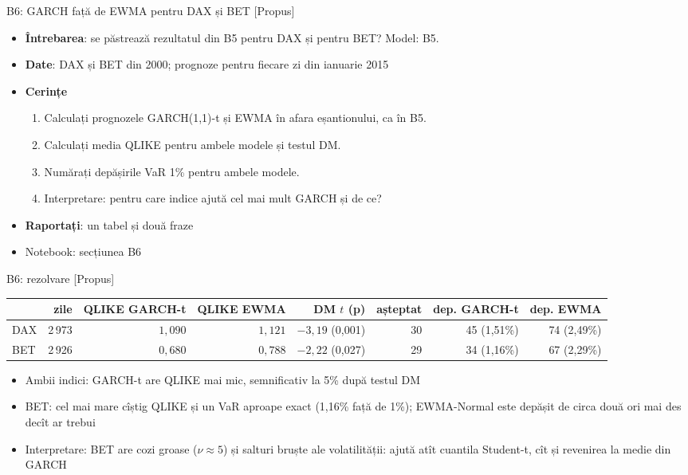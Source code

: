 \begin{frame}{B6: GARCH față de EWMA pentru DAX și BET [Propus]}
\itemsize{\footnotesize}
\begin{itemize}
\item \textbf{Întrebarea}: se păstrează rezultatul din B5 pentru DAX și pentru BET? Model: B5.
\item \textbf{Date}: DAX și BET din 2000; prognoze pentru fiecare zi din ianuarie 2015
\item \textbf{Cerințe}
\begin{enumerate}
    \item Calculați prognozele GARCH(1,1)-t și EWMA în afara eșantionului, ca în B5.
    \item Calculați media QLIKE pentru ambele modele și testul DM.
    \item Numărați depășirile VaR 1\% pentru ambele modele.
    \item Interpretare: pentru care indice ajută cel mai mult GARCH și de ce?
\end{enumerate}
\item \textbf{Raportați}: un tabel și două fraze
\item Notebook: secțiunea B6
\end{itemize}
\end{frame}

\ifsolutions
\begin{frame}{B6: rezolvare [Propus]}
\itemsize{\footnotesize}
\begin{center}
\scriptsize
\begin{tabular}{lrrrrrrr}
\toprule
& zile & QLIKE GARCH-t & QLIKE EWMA & DM $t$ (p) & așteptat & dep. GARCH-t & dep. EWMA \\
\midrule
DAX & 2\,973 & $1{,}090$ & $1{,}121$ & ${-3{,}19}$ (0{,}001) & 30 & 45 (1{,}51\%) & 74 (2{,}49\%) \\
BET & 2\,926 & $0{,}680$ & $0{,}788$ & ${-2{,}22}$ (0{,}027) & 29 & 34 (1{,}16\%) & 67 (2{,}29\%) \\
\bottomrule
\end{tabular}
\end{center}
\begin{itemize}
    \item Ambii indici: GARCH-t are QLIKE mai mic, semnificativ la 5\% după testul DM
    \item BET: cel mai mare cîștig QLIKE și un VaR aproape exact (1{,}16\% față de 1\%); EWMA-Normal este depășit de circa două ori mai des decît ar trebui
    \item Interpretare: BET are cozi groase ($\nu \approx 5$) și salturi bruște ale volatilității: ajută atît cuantila Student-t, cît și revenirea la medie din GARCH
\end{itemize}
\end{frame}
\fi


